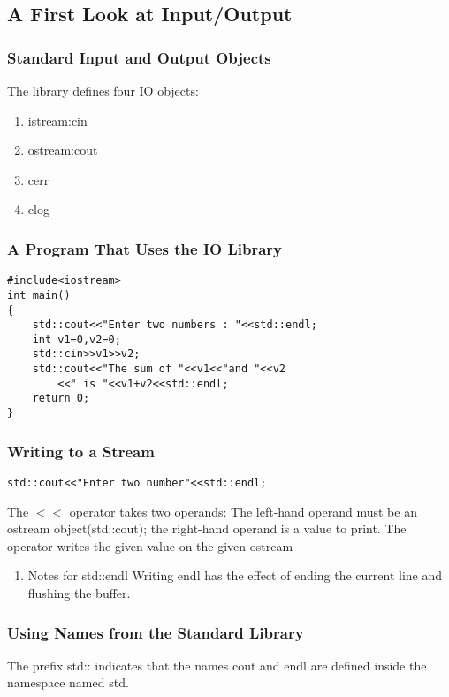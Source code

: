 \documentclass[11pt]{article}
\begin{document}
\subsection{A First Look at Input/Output}
\label{sec-1-2}
\subsubsection{Standard Input and Output Objects}
\label{sec-1-2-1}
The library defines four IO objects:
\begin{enumerate}
\item istream:cin
\item ostream:cout
\item cerr
\item clog
\end{enumerate}
\subsubsection{A Program That Uses the IO Library}
\label{sec-1-2-2}
\begin{verbatim}
#include<iostream>
int main()
{
    std::cout<<"Enter two numbers : "<<std::endl;
    int v1=0,v2=0;
    std::cin>>v1>>v2;
    std::cout<<"The sum of "<<v1<<"and "<<v2
        <<" is "<<v1+v2<<std::endl;
    return 0;
}
\end{verbatim}
\subsubsection{Writing to a Stream}
\label{sec-1-2-3}
\begin{verbatim}
std::cout<<"Enter two number"<<std::endl;
\end{verbatim}
The $<<$ operator takes two operands:
The left-hand operand must be an ostream object(std::cout); 
the right-hand operand is a value to print.
The operator writes the given value on the given ostream
\begin{enumerate}
\item Notes for std::endl
\label{sec-1-2-3-1}
Writing endl has the effect of ending the current line and flushing the buffer.
\end{enumerate}
\subsubsection{Using Names from the Standard Library}
\label{sec-1-2-4}
The prefix std:: indicates that the names cout and endl are defined inside the
namespace named std.
\end{document}
